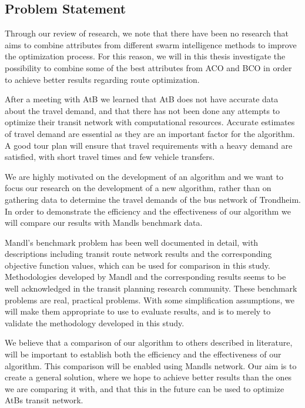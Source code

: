 \subsection{Problem Statement}
Through our review of research, we note that there have been no research that aims to combine attributes from different swarm intelligence methods to improve the optimization process. For this reason, we will in this thesis investigate the possibility to combine some of the best attributes from ACO and BCO in order to achieve better results regarding route optimization.

After a meeting with AtB we learned that AtB does not have accurate data about the travel demand, and that there has not been done any attempts to optimize their transit network with computational resources. Accurate estimates of travel demand are essential as they are an important factor for the algorithm. A good tour plan will ensure that travel requirements with a heavy demand are satisfied, with short travel times and few vehicle transfers. 

We are highly motivated on the development of an algorithm and we want to focus our research on the development of a new algorithm, rather than on gathering data to determine the travel demands of the bus network of Trondheim. In order to demonstrate the efficiency and the effectiveness of our algorithm we will compare our results with Mandls benchmark data. 

Mandl's benchmark problem has been well documented in detail, with descriptions including transit route network results and the corresponding objective function values, which can be used for comparison in this study. Methodologies developed by Mandl and the corresponding results seems to be well acknowledged in the transit planning research community. These benchmark problems are real, practical problems. With some simplification assumptions, we will make them appropriate to use to evaluate results, and is to merely to validate the methodology developed in this study. 

We believe that a comparison of our algorithm to others described in literature, will be important to establish both the efficiency and the effectiveness of our algorithm. This comparison will be enabled using Mandls network. Our aim is to create a general solution, where we hope to achieve better results than the ones we are comparing it with, and that this in the future can be used to optimize AtBs transit network. 

